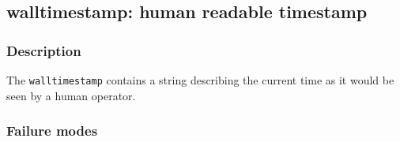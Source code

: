 \clearpage
{}
{}
\label{vars:walltimestamp}
\subsection*{walltimestamp: human readable timestamp}

\subsubsection*{Description}

The \verb|walltimestamp| contains a string describing the current time
as it would be seen by a human operator.

\subsubsection*{Failure modes}

